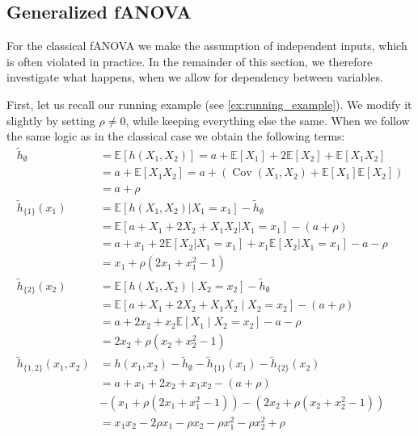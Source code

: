 \subsection{Generalized fANOVA}
For the classical fANOVA we make the assumption of independent inputs, which is often violated in practice. In the remainder of this section, we therefore investigate what happens, when we allow for dependency between variables.\par
First, let us recall our running example (see \autoref{ex:running_example}). We modify it slightly by setting $\rho\neq 0$, while keeping everything else the same. When we follow the same logic as in the classical case we obtain the following terms:
\begin{align*}
\tilde{h}_{\emptyset} &= \mathbb{E}[h(X_1, X_2)] 
= a + \mathbb{E}[X_1] + 2\mathbb{E}[X_2] + \mathbb{E}[X_1 X_2] \\
&= a + \mathbb{E}[X_1 X_2] 
= a + \left( \operatorname{Cov}(X_1, X_2) + \mathbb{E}[X_1]\mathbb{E}[X_2] \right) \\
&= a + \rho \\
\tilde{h}_{\{1\}}(x_1) 
&= \mathbb{E}[h(X_1, X_2) | X_1 = x_1] - \tilde{h}_{\emptyset} \\
&= \mathbb{E}[a + X_1 + 2X_2 + X_1 X_2 | X_1 = x_1] - (a + \rho) \\
&= a + x_1 + 2\mathbb{E}[X_2 | X_1 = x_1] + x_1 \mathbb{E}[X_2 | X_1 = x_1] - a - \rho \\
&= x_1 + \rho(2x_1 + x_1^2 - 1) \\
\tilde{h}_{\{2\}}(x_2) 
&= \mathbb{E}[h(X_1, X_2) \mid X_2 = x_2] - \tilde{h}_{\emptyset} \\
&= \mathbb{E}[a + X_1 + 2X_2 + X_1 X_2 \mid X_2 = x_2] - (a + \rho) \\
&= a + 2x_2 + x_2 \mathbb{E}[X_1 \mid X_2 = x_2] - a - \rho \\
&= 2x_2 + \rho(x_2 + x_2^2 - 1) \\
\tilde{h}_{\{1,2\}}(x_1, x_2) 
&= h(x_1, x_2) - \tilde{h}_{\emptyset} - \tilde{h}_{\{1\}}(x_1) - \tilde{h}_{\{2\}}(x_2) \\
&= a + x_1 + 2x_2 + x_1 x_2 - (a + \rho) \\
&- (x_1 + \rho(2x_1 + x_1^2 - 1)) - (2x_2 + \rho(x_2 + x_2^2 - 1))\\
&= x_1 x_2 - 2\rho x_1 - \rho x_2  - \rho x_1^2  - \rho x_2^2 + \rho
\end{align*}

